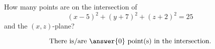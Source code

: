 \documentclass{ximera}
\author{Bart Snapp}
\begin{document}
\begin{exercise}
  How many points are on the intersection of
  \[
  (x-5)^2 + (y+7)^2 + (z+2)^2 = 25
  \]
  and the $(x,z)$-plane?
  \begin{prompt}
  \[
  \text{There is/are $\answer{0}$ point(s) in the intersection.}
  \]
  \end{prompt}
\end{exercise}
\end{document}
